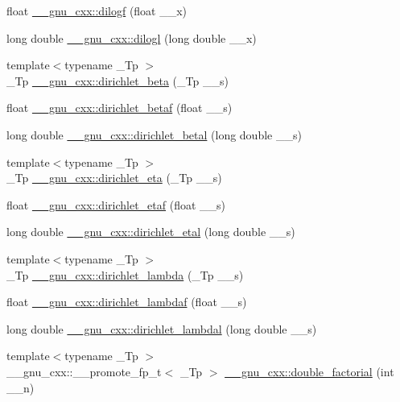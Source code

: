 \begin{DoxyCompactItemize}
\item 
float \hyperlink{group__gnu__math__spec__func_ga901091e0e7ce7d6113ae6a86f4865a92}{\+\_\+\+\_\+gnu\+\_\+cxx\+::dilogf} (float \+\_\+\+\_\+x)
\item 
long double \hyperlink{group__gnu__math__spec__func_gae90c13ee690ebaf10a18a900fe2646f9}{\+\_\+\+\_\+gnu\+\_\+cxx\+::dilogl} (long double \+\_\+\+\_\+x)
\item 
{\footnotesize template$<$typename \+\_\+\+Tp $>$ }\\\+\_\+\+Tp \hyperlink{group__gnu__math__spec__func_ga87466a2d429a2815d794acc21c882b08}{\+\_\+\+\_\+gnu\+\_\+cxx\+::dirichlet\+\_\+beta} (\+\_\+\+Tp \+\_\+\+\_\+s)
\item 
float \hyperlink{group__gnu__math__spec__func_ga9bb40e20b18e3eb822e70af955940830}{\+\_\+\+\_\+gnu\+\_\+cxx\+::dirichlet\+\_\+betaf} (float \+\_\+\+\_\+s)
\item 
long double \hyperlink{group__gnu__math__spec__func_gaed6fd85a4577f4de66d74742a1850a13}{\+\_\+\+\_\+gnu\+\_\+cxx\+::dirichlet\+\_\+betal} (long double \+\_\+\+\_\+s)
\item 
{\footnotesize template$<$typename \+\_\+\+Tp $>$ }\\\+\_\+\+Tp \hyperlink{group__gnu__math__spec__func_gae46e26e4107675d285c79a2d6202e6c7}{\+\_\+\+\_\+gnu\+\_\+cxx\+::dirichlet\+\_\+eta} (\+\_\+\+Tp \+\_\+\+\_\+s)
\item 
float \hyperlink{group__gnu__math__spec__func_ga6f05d076600b1de9193e586cf89547c9}{\+\_\+\+\_\+gnu\+\_\+cxx\+::dirichlet\+\_\+etaf} (float \+\_\+\+\_\+s)
\item 
long double \hyperlink{group__gnu__math__spec__func_ga408e2267b648f29445522dbafb7a0e1a}{\+\_\+\+\_\+gnu\+\_\+cxx\+::dirichlet\+\_\+etal} (long double \+\_\+\+\_\+s)
\item 
{\footnotesize template$<$typename \+\_\+\+Tp $>$ }\\\+\_\+\+Tp \hyperlink{group__gnu__math__spec__func_ga06842a81bdcabf9c62252dde992d42ee}{\+\_\+\+\_\+gnu\+\_\+cxx\+::dirichlet\+\_\+lambda} (\+\_\+\+Tp \+\_\+\+\_\+s)
\item 
float \hyperlink{group__gnu__math__spec__func_gaafd3ca6b0d71d55d3835536396eece8f}{\+\_\+\+\_\+gnu\+\_\+cxx\+::dirichlet\+\_\+lambdaf} (float \+\_\+\+\_\+s)
\item 
long double \hyperlink{group__gnu__math__spec__func_gab28d06c4e3c7457f1fa3663168678fb2}{\+\_\+\+\_\+gnu\+\_\+cxx\+::dirichlet\+\_\+lambdal} (long double \+\_\+\+\_\+s)
\item 
{\footnotesize template$<$typename \+\_\+\+Tp $>$ }\\\+\_\+\+\_\+gnu\+\_\+cxx\+::\+\_\+\+\_\+promote\+\_\+fp\+\_\+t$<$ \+\_\+\+Tp $>$ \hyperlink{group__gnu__math__spec__func_ga08c31a5dd1686a7633b46f923c47af46}{\+\_\+\+\_\+gnu\+\_\+cxx\+::double\+\_\+factorial} (int \+\_\+\+\_\+n)

\end{DoxyCompactItemize}
